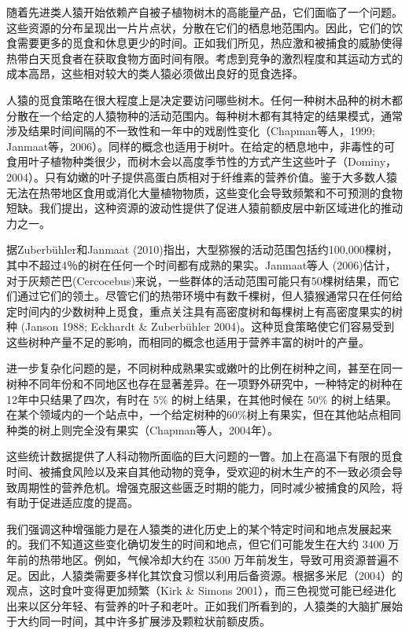 随着先进类人猿开始依赖产自被子植物树木的高能量产品，它们面临了一个问题。这些资源的分布呈现出一片片点状，分散在它们的栖息地范围内。因此，它们的饮食需要更多的觅食和休息更少的时间。正如我们所见，热应激和被捕食的威胁使得热带白天觅食者在获取食物方面时间有限。考虑到竞争的激烈程度和其运动方式的成本高昂，这些相对较大的类人猿必须做出良好的觅食选择。

人猿的觅食策略在很大程度上是决定要访问哪些树木。任何一种树木品种的树木都分散在一个给定的人猿物种的活动范围内。每种树木都有其特定的结果模式，通常涉及结果时间间隔的不一致性和一年中的戏剧性变化（Chapman等人，1999; Janmaat等，2006）。同样的概念也适用于树叶。在给定的栖息地中，非毒性的可食用叶子植物种类很少，而树木会以高度季节性的方式产生这些叶子（Dominy，2004）。只有幼嫩的叶子提供高蛋白质相对于纤维素的营养价值。鉴于大多数人猿无法在热带地区食用或消化大量植物物质，这些变化会导致频繁和不可预测的食物短缺。我们提出，这种资源的波动性提供了促进人猿前额皮层中新区域进化的推动力之一。

据Zuberbühler和Janmaat (2010)指出，大型猕猴的活动范围包括约100,000棵树，其中不超过4％的树在任何一个时间都有成熟的果实。Janmaat等人 (2006)估计，对于灰颊芒巴(Cercocebus)来说，一些群体的活动范围可能只有50棵树结果，而它们通过它们的领土。尽管它们的热带环境中有数千棵树，但人猿猴通常只在任何给定时间内的少数树种上觅食，重点关注具有高密度树和每棵树上有高密度果实的树种 (Janson 1988; Eckhardt \& Zuberbühler 2004)。这种觅食策略使它们容易受到这些树种产量不足的影响，而相同的概念也适用于营养丰富的树叶的产量。

进一步复杂化问题的是，不同树种成熟果实或嫩叶的比例在树种之间，甚至在同一树种不同年份和不同地区也存在显著差异。在一项野外研究中，一种特定的树种在12年中只结果了四次，有时在 5\% 的树上结果，在其他时候在 50\% 的树上结果。在某个领域内的一个站点中，一个给定树种的60\%树上有果实，但在其他站点相同种类的树上则完全没有果实（Chapman等人，2004年）。

这些统计数据提供了人科动物所面临的巨大问题的一瞥。加上在高温下有限的觅食时间、被捕食风险以及来自其他动物的竞争，受欢迎的树木生产的不一致必须会导致周期性的营养危机。增强克服这些匮乏时期的能力，同时减少被捕食的风险，将有助于促进适应度的提高。

我们强调这种增强能力是在人猿类的进化历史上的某个特定时间和地点发展起来的。我们不知道这些变化确切发生的时间和地点，但它们可能发生在大约 3400 万年前的热带地区。例如，气候冷却大约在 3500 万年前发生，导致可用资源普遍不足。因此，人猿类需要多样化其饮食习惯以利用后备资源。根据多米尼（2004）的观点，这时食叶变得更加频繁（Kirk \& Simons 2001），而三色视觉可能已经进化出来以区分年轻、有营养的叶子和老叶。正如我们所看到的，人猿类的大脑扩展始于大约同一时间，其中许多扩展涉及颗粒状前额皮质。


